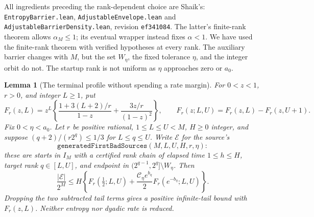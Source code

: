\documentclass[11pt]{article}
\newtheorem{lemma}[proposition]{Lemma}
\theoremstyle{remark}\newtheorem{remark}[proposition]{Remark}
\begin{document}
All ingredients preceding the rank-dependent choice are Shaik's:
\texttt{EntropyBarrier.lean}, \texttt{AdjustableEnvelope.lean} and
\texttt{AdjustableBarrierDensity.lean}, revision \texttt{ef341084}.
The latter's finite-rank theorem allows \(\alpha_M\le1\);
its eventual wrapper instead fixes \(\alpha<1\).
We have used the finite-rank theorem with verified hypotheses at every
rank. The auxiliary barrier changes with \(M\), but the set
\(W_\eta\), the fixed tolerance \(\eta\), and the integer orbit do not.
The startup rank is not uniform as \(\eta\) approaches zero or \(a_0\).

\begin{lemma}[The terminal profile without spending a rate margin]
\label{lem:shaik-entropy-terminal}
For \(0<z<1\), \(r>0\), and integer \(L\ge1\), put
\[
 F_r(z,L)=z^L\left\{
 \frac{1+3(L+2)/r}{1-z}+\frac{3z/r}{(1-z)^2}\right\},
 \qquad
 F_r(z;L,U)=F_r(z,L)-F_r(z,U+1).
\]
Fix \(0<\eta<a_0\). Let \(r\) be positive rational,
\(1\le L\le U<M\), \(H\ge0\) integer,
and suppose \((q+2)/(r2^q)\le1/3\) for \(L\le q\le U\).
Write \(\mathcal E\) for the source's
\[
 \texttt{generatedFirstBadSources}(M,L,U,H,r,\eta):
\]
these are starts in \(I_M\) with a certified rank chain of elapsed time
\(1\le h\le H\), target rank \(q\in[L,U]\), and endpoint in
\((2^{q-1},2^q]\setminus W_\eta\).
Then
\begin{equation}\label{eq:shaik-entropy-terminal}
 \frac{|\mathcal E|}{2^M}\le
 H\left\{F_r(\tfrac12;L,U)+
     \frac{\mathcal C_\eta e^{b_\eta}}2
                F_r(e^{-b_\eta};L,U)\right\}.
\end{equation}
Dropping the two subtracted tail terms gives a positive infinite-tail
bound with \(F_r(z,L)\). Neither entropy nor dyadic rate is reduced.
\end{lemma}
\end{document}
